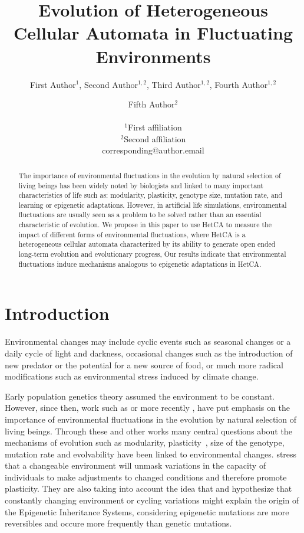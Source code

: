 \documentclass[letterpaper]{article}
\title{Evolution of Heterogeneous Cellular Automata in Fluctuating Environments}
\author{First Author$^{1}$, Second Author$^{1,2}$, Third Author$^{1,2}$, Fourth Author$^{1,2}$ \and Fifth Author$^2$ \\
\mbox{}\\
$^1$First affiliation  \\
$^2$Second affiliation \\
corresponding@author.email}
\begin{document}
\maketitle

\begin{abstract}
The importance of environmental fluctuations in the evolution by natural selection of living beings has been widely noted by biologists and linked to many important characteristics of life such as: modularity, plasticity, genotype size, mutation rate, and learning or epigenetic adaptations. However, in artificial life simulations, environmental fluctuations are usually seen as a problem to be solved rather than an essential characteristic of evolution. We propose in this paper to use HetCA to measure the impact of different forms of environmental fluctuations, where HetCA is a heterogeneous cellular automata characterized by its ability to generate open ended long-term evolution and evolutionary progress, Our results indicate that environmental fluctuations induce mechanisms analogous to epigenetic adaptations in HetCA.
\end{abstract}



\section{Introduction}\label{secintro}
Environmental changes may include cyclic events such as seasonal changes or a daily cycle of light and darkness, occasional changes such as the introduction of new predator or the potential for a new source of food, or much more radical modifications such as environmental stress induced by climate change.

Early population genetics theory assumed the environment to be constant. However, since then, work such as \citep{levins1968evolution} or more recently \citep{jablonka2014evolution}, have put emphasis on the importance of environmental fluctuations in the evolution by natural selection of living beings. Through these and other works many central questions about the mechanisms of evolution such as modularity, plasticity~\citep{west2005developmental}, size of the genotype, mutation rate and evolvability have been linked to environmental changes. \cite{jablonka2014evolution} stress that a changeable environment will unmask variations in the capacity of individuals to make adjustments to changed conditions and therefore promote plasticity. They are also taking into account the idea that  and hypothesize that constantly changing environment or cycling variations might explain the origin of the Epigenetic Inheritance Systems, considering epigenetic mutations are more reversibles and occure more frequently than genetic mutations. 
\end{document}
